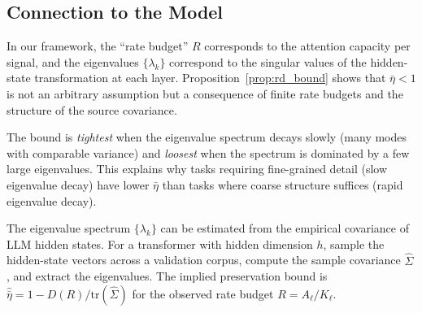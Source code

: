 \subsection{Connection to the Model}

In our framework, the ``rate budget'' $R$ corresponds to the attention capacity per signal, and the eigenvalues $\{\lambda_k\}$ correspond to the singular values of the hidden-state transformation at each layer. Proposition~\ref{prop:rd_bound} shows that $\bar{\eta} < 1$ is not an arbitrary assumption but a consequence of finite rate budgets and the structure of the source covariance.

The bound is \emph{tightest} when the eigenvalue spectrum decays slowly (many modes with comparable variance) and \emph{loosest} when the spectrum is dominated by a few large eigenvalues. This explains why tasks requiring fine-grained detail (slow eigenvalue decay) have lower $\bar{\eta}$ than tasks where coarse structure suffices (rapid eigenvalue decay).

\begin{remark}
The eigenvalue spectrum $\{\lambda_k\}$ can be estimated from the empirical covariance of LLM hidden states. For a transformer with hidden dimension $h$, sample the hidden-state vectors across a validation corpus, compute the sample covariance $\hat{\Sigma}$, and extract the eigenvalues. The implied preservation bound is $\hat{\bar{\eta}} = 1 - D(R) / \text{tr}(\hat{\Sigma})$ for the observed rate budget $R = A_\ell / K_\ell$.
\end{remark}
